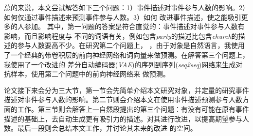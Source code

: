 \par{
    总的来说，本文尝试解答如下三个问题：1）事件描述对事件参与人数的影响。2）如何仅通过事件描述来预测事件参与人数。3）如何
    改进事件描述，使之能吸引更多的人参加。 其中，第一问题的答案是符合直觉的：事件描述对事件参与人数有影响，而且影响程度与
    不同的词语有关，例如包含\textit{party}的描述比包含\textit{church}的描述的参与人数要高不少。在研究第二个问题上，
    ，由于对象是自然语言，我使用了一个经典的带卷积层的前向神经网络和词向量来做预测。在解答第三个问题上，我使用了一个改进的
    差分自动编码器(\textit{VAE})的序列到序列(\textit{seq2seq})网络来生成对抗样本，使用第二个问题中的前向神经网络来
    做预测。
}

\par{
    论文接下来会分为三大节，第一节会先简单介绍本文研究对象，并定量的研究事件描述对事件参与人数的影响。第二节则会介绍本文在使用事件描述预测参与人数方面的工作。第三节则会解答上一自然段提出的第三个问题：有没有可能在原有事件
    描述的基础上，去自动生成更有吸引力的描述。对其进行改进，以提高期望参与人数。最后一段则会总结本文工作，并讨论其未来的改进
    的空间。
}
   
